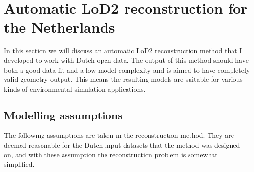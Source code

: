 




\section{Automatic LoD2 reconstruction for the Netherlands}
In this section we will discuss an automatic LoD2 reconstruction method that I developed to work with Dutch open data. 
The output of this method should have both a good data fit and a low model complexity and is aimed to have completely valid geometry output. 
This means the resulting models are suitable for various kinds of environmental simulation applications.

\subsection{Modelling assumptions}
The following assumptions are taken in the reconstruction method. They are deemed reasonable for the Dutch input datasets that the method was designed on, and with these assumption the reconstruction problem is somewhat simplified.

